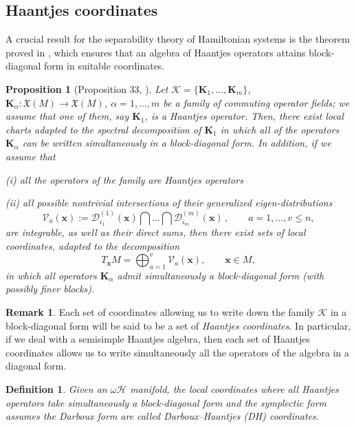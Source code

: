 \documentclass[10pt]{amsart}
\numberwithin{equation}{section}
\newcommand{\bs}{\boldsymbol}
\newtheorem{definition}{Definition}
\newtheorem{proposition}{Proposition}
\theoremstyle{definition}
\newtheorem{remark}{\textbf{Remark}}
\begin{document}
	\subsection{Haantjes coordinates}
A crucial result for the separability theory of Hamiltonian systems is the theorem proved in \cite{TT2021JGP}, which ensures that an algebra of Haantjes operators attains block-diagonal form in suitable coordinates.
	
	
	
	\begin{proposition} [Proposition 33, \cite{TT2021JGP}] \label{th:HJ}
		Let $\mathcal{K}=\{\boldsymbol{K}_1,\ldots,\boldsymbol{K}_m\}$, $\boldsymbol{K}_\alpha: \mathfrak{X}(M)\to \mathfrak{X}(M)$, $\alpha=1,\ldots,m$ be a family of commuting operator fields; we assume that one of them, say $\boldsymbol{K}_1$, is a Haantjes operator. Then, there exist local charts adapted to the spectral decomposition of $\bs{K}_1$ in which all of the operators $\boldsymbol{K}_\alpha$ can be written simultaneously in a block-diagonal form. In addition, if we assume that
		
		(i) all the operators of the family are Haantjes operators
		
		(ii) all possible nontrivial intersections  of their generalized eigen-distributions
	\begin{equation}
		\label{eq:Va}
		\mathcal{V}_a(\boldsymbol{x}):= \mathcal{D}_{i_1}^{(1)}(\boldsymbol{x}) \bigcap \ldots \bigcap \mathcal{D}_{i_m}^{(m)}(\boldsymbol{x}) \,, \qquad a=1,\ldots, v\leq n,
		\end{equation}
		are integrable, as well as their direct sums, then there exist sets of local coordinates, adapted to the decomposition
		\begin{equation}
			\label{eq:TVa}
			T_{\boldsymbol{x}}M= \bigoplus_{a=1}^{v}\mathcal{V}_a( \boldsymbol{x}), \qquad \boldsymbol{x} \in M,
		\end{equation}
		in which all operators $\boldsymbol{K}_\alpha$ admit simultaneously a block-diagonal form (with possibly finer blocks).
	\end{proposition}
	
	\begin{remark}
		Each set of coordinates allowing us to write down the family $\mathcal{K}$ in a block-diagonal form will be said to be a set of \textit{Haantjes coordinates}. In particular, if we deal with a semisimple Haantjes algebra, then each set of Haantjes coordinates allows us to write simultaneously all the operators of the algebra in a diagonal form.
	\end{remark}
	\begin{definition}
		Given an $\omega \mathscr{H}$ manifold, the local coordinates where all Haantjes operators take simultaneously a block-diagonal form and the symplectic form assumes the Darboux form are called Darboux--Haantjes (DH) coordinates.
	\end{definition}
\end{document}
